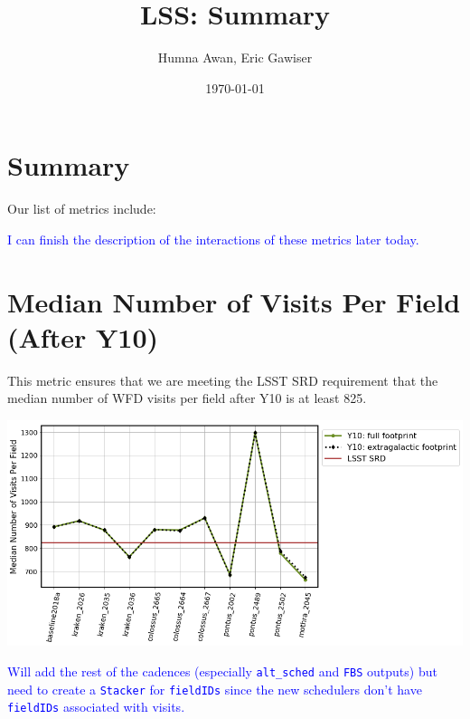 \documentclass[a4paper,10pt]{article}
\title{LSS: Summary}
\author{Humna Awan, Eric Gawiser}
\date{\today}
\newcommand{\ttt}[1]{\texttt{#1}}
\newcommand{\clB}[1]{\textcolor{blue}{#1}}
\begin{document}
\maketitle
\section*{Summary}
Our list of metrics include:
\

\noindent\clB{I can finish the description of the interactions of these metrics later today.}

\newpage
\section*{Median Number of Visits Per Field (After Y10)\label{median visits}}
This metric ensures that we are meeting the LSST SRD requirement that the median number of WFD visits per field after Y10 is at least 825.

\begin{minipage}{\columnwidth}
\centering
 \includegraphics[width=.9\columnwidth]{lss_compare_median_nvisits_11dbs.png}
\end{minipage}

\clB{Will add the rest of the cadences (especially \ttt{alt\_sched} and \ttt{FBS} outputs) but need to create a \ttt{Stacker} for \ttt{fieldIDs} since the new schedulers don't have \ttt{fieldIDs} associated with visits.}
\end{document}
